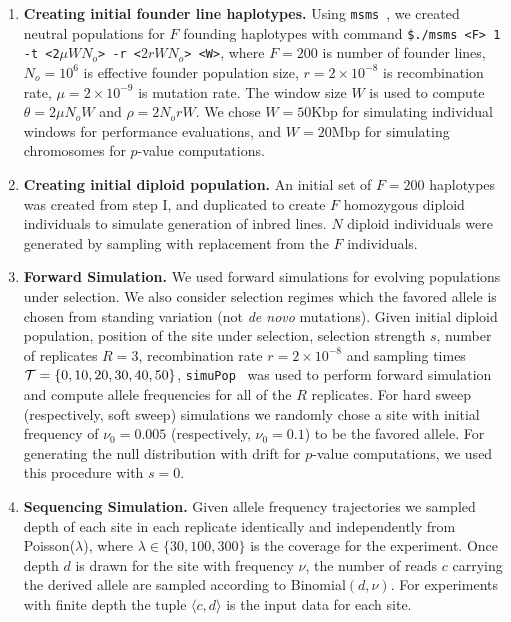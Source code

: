 \documentclass[9pt,twocolumn,twoside]{gsajnl}
\begin{document}
\begin{enumerate}
	\item {\bf Creating initial founder line haplotypes.} Using
	\texttt{msms}~\cite{ewing2010msms}, we created neutral populations
	for $F$ founding haplotypes with command \texttt{\$./msms <F> 1 -t
		<2$\mu WN_o$> -r <$2rWN_o$> <W>}, where $F=200$ is number of 
	founder
	lines, $N_o=10^6$ is effective founder population size,
	$r=2\times10^{-8}$ is recombination rate, $\mu=2\times 10^{-9}$ is
	mutation rate. The window size $W$ is used to compute $\theta=2\mu
	N_oW$ and $\rho=2N_orW$. We chose $W=50$Kbp for simulating
	individual windows for performance evaluations, and $W=20$Mbp for
	simulating \dmel chromosomes for $p$-value computations.
	
	\item{\bf Creating initial diploid population.} An initial set of
	$F=200$ haplotypes was created from step I, and duplicated to create
	$F$ homozygous diploid individuals to simulate generation of inbred
	lines. $N$ diploid individuals were generated by sampling with
	replacement from the $F$ individuals.
	
	\item{\bf Forward Simulation.} We used forward simulations for
	evolving populations under selection. We also consider selection
	regimes which the favored allele is chosen from standing variation
	(not \emph{de novo} mutations). Given initial diploid population,
	position of the site under selection, selection strength $s$, number
	of replicates $R=3$, recombination rate $r=2\times10^{-8}$ and
	sampling times ${\cal T}=\{0,10,20,30,40,50\}$,
	\texttt{simuPop}~\cite{peng2005simupop} was used to perform forward
	simulation and compute allele frequencies for all of the $R$
	replicates.  For hard sweep (respectively, soft sweep) simulations
	we randomly chose a site with initial frequency of $\nu_0=0.005$
	(respectively, $\nu_0=0.1$) to be the favored allele. For generating
	the null distribution with drift for $p$-value computations, we used
	this procedure with $s=0$.
	
	\item{\bf Sequencing Simulation.} Given allele frequency trajectories
	we sampled depth of each site in each replicate identically and
	independently from Poisson($\lambda$), where $\lambda \in
	\{30,100,300\}$ is the coverage for the experiment. Once depth $d$
	is drawn for the site with frequency $\nu$, the number of reads $c$
	carrying the derived allele are sampled according to
	Binomial$(d,\nu)$. For experiments with finite depth the tuple
	$\langle c,d\rangle$ is the input data for each site.
\end{enumerate}
\end{document}
